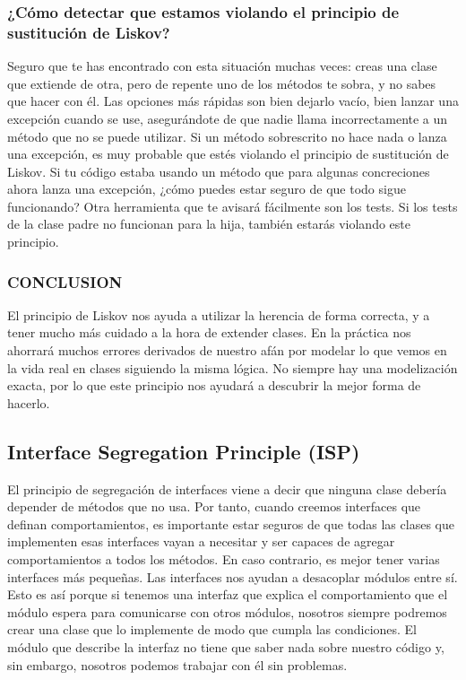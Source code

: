 \documentclass[12pt,letterpaper]{article}
\begin{document}
\subsubsection{ ¿Cómo detectar que estamos violando el principio de sustitución de Liskov?}
Seguro que te has encontrado con esta situación muchas veces: creas una clase que
extiende de otra, pero de repente uno de los métodos te sobra, y no sabes que hacer
con él. Las opciones más rápidas son bien dejarlo vacío, bien lanzar una excepción
cuando se use, asegurándote de que nadie llama incorrectamente a un método que
no se puede utilizar.
Si un método sobrescrito no hace nada o lanza una excepción, es muy probable
que estés violando el principio de sustitución de Liskov. Si tu código estaba
usando un método que para algunas concreciones ahora lanza una excepción, ¿cómo
puedes estar seguro de que todo sigue funcionando?
Otra herramienta que te avisará fácilmente son los tests. Si los tests de la clase padre
no funcionan para la hija, también estarás violando este principio.

\subsubsection{CONCLUSION}

El principio de Liskov nos ayuda a utilizar la herencia de forma correcta, y a tener
mucho más cuidado a la hora de extender clases. En la práctica nos ahorrará muchos
errores derivados de nuestro afán por modelar lo que vemos en la vida real en clases
siguiendo la misma lógica. No siempre hay una modelización exacta, por lo que este
principio nos ayudará a descubrir la mejor forma de hacerlo.

\subsection{Interface Segregation Principle (ISP)}

El principio de segregación de interfaces viene a decir que ninguna clase debería
depender de métodos que no usa. Por tanto, cuando creemos interfaces que definan
comportamientos, es importante estar seguros de que todas las clases que implementen esas interfaces vayan a necesitar y ser capaces de agregar comportamientos
a todos los métodos. En caso contrario, es mejor tener varias interfaces más
pequeñas.
Las interfaces nos ayudan a desacoplar módulos entre sí. Esto es así porque si
tenemos una interfaz que explica el comportamiento que el módulo espera para
comunicarse con otros módulos, nosotros siempre podremos crear una clase que lo
implemente de modo que cumpla las condiciones. El módulo que describe la interfaz
no tiene que saber nada sobre nuestro código y, sin embargo, nosotros podemos
trabajar con él sin problemas.
\end{document}
